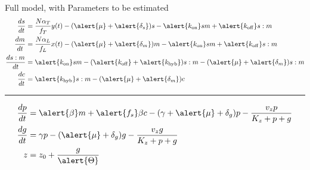 \documentclass{beamer}
\begin{document}
\small
\begin{frame}{Full model, with Parameters to be estimated}
\begin{align} 
\frac{ds}{dt} &= \frac{N\alpha_{T}}{f_{T}} y(t)-(\alert{\mu} + \alert{\delta_{s}})s -\alert{k_{\mathrm{on}}}sm +\alert{k_{\mathrm{off}}}s:m \\
\frac{dm}{dt} &=  \frac{N\alpha_{L}}{f_{L}}x(t)-(\alert{\mu} + \alert{\delta_{m}})m -\alert{k_{\mathrm{on}}}sm +\alert{k_{\mathrm{off}}}s:m  \\
\frac{ds:m}{dt} & = \alert{k_{\mathrm{on}}}sm  - (\alert{k_{\mathrm{off}}}+ \alert{k_{\mathrm{hyb}}})s:m  -(\alert{\mu} + \alert{\delta_{m}} )s:m \\
\frac{dc}{dt} & = \alert{k_{\mathrm{hyb}}}s:m  -(\alert{\mu} + \alert{\delta_{m}})c  
\end{align}
\begin{center}
\rule{0.5\textwidth}{.4pt}
\end{center}
\begin{align}
\frac{dp}{dt} & = \alert{\beta} m +\alert{f_{s}}\beta c -(\gamma + \alert{\mu} + \delta_{g})p - \frac{v_{z}p}{K_{z}+p+g}   \\
\frac{dg}{dt} & = \gamma p - (\alert{\mu} + \delta_{g})g - \frac{v_{z}g}{K_{z}+p+g} \\
z &= z_{0} +\frac{g}{\alert{\Theta}} 
\end{align}
\end{frame}
\normalsize
\end{document}
